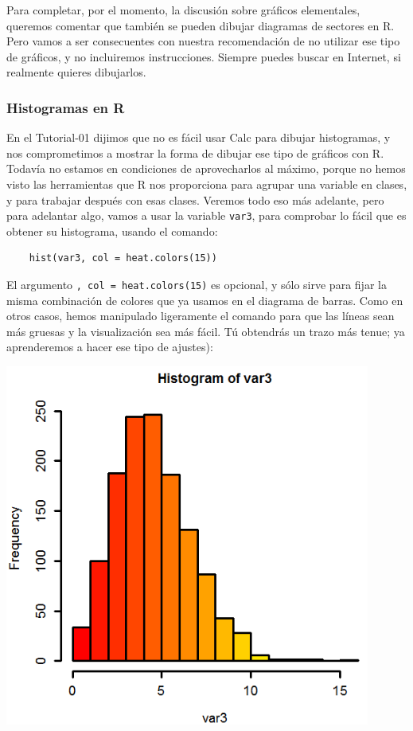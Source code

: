 \documentclass[10pt,a4paper]{article}\usepackage[]{graphicx}\usepackage[]{color}
\begin{document}
Para completar, por el momento, la discusión sobre gráficos elementales, queremos comentar que también se pueden dibujar diagramas de sectores en R. Pero vamos a ser consecuentes con nuestra recomendación de no utilizar ese tipo de gráficos, y no incluiremos instrucciones. Siempre puedes buscar en Internet, si realmente quieres dibujarlos.

\subsubsection*{Histogramas en R}
\label{tut02:subsubsec:HistogramasR}

En el Tutorial-01 dijimos que no es fácil usar Calc para dibujar histogramas, y nos comprometimos a mostrar la forma de dibujar ese tipo de gráficos con R. Todavía no estamos en condiciones de aprovecharlos al máximo, porque no hemos visto las herramientas que R nos proporciona para agrupar una variable en clases, y para trabajar después con esas clases. Veremos todo eso más adelante, pero para adelantar algo, vamos a usar la variable {\tt var3}, para comprobar lo fácil que es obtener su histograma, usando el comando:
\begin{verbatim}
    hist(var3, col = heat.colors(15))
\end{verbatim}
El argumento {\tt , col = heat.colors(15)} es opcional, y sólo sirve para fijar la misma combinación de colores que ya usamos en el diagrama de barras. Como en otros casos, hemos manipulado ligeramente el comando para que las líneas sean más gruesas y la visualización sea más fácil. Tú obtendrás un trazo más tenue; ya aprenderemos a hacer ese tipo de ajustes):

\begin{center}
  \includegraphics[width=12cm]{../fig/Tut02-59.png}
\end{center}
\end{document}
